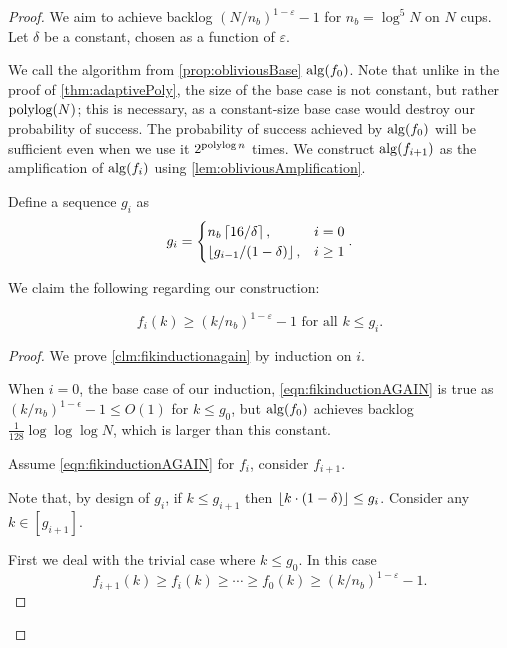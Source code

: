 \begin{proof}
  We aim to achieve backlog $(N/n_b)^{1-\varepsilon}-1$ for 
  $n_b = \log^5 N$ on $N$ cups.
  Let $\delta$ be a constant, chosen as a function of $\varepsilon$.

  We call the algorithm from \cref{prop:obliviousBase}
  $\operatorname{\text{\textup{alg}}}(f_0)$. Note that unlike in the proof of
  \cref{thm:adaptivePoly}, the size of the base case is not
  constant, but rather $\operatorname{\text{polylog}}(N)$; this is necessary, as a
  constant-size base case would destroy our probability of
  success. The probability of success achieved by $\operatorname{\text{\textup{alg}}}(f_0)$
  will be sufficient even when we use it $2^{\operatorname{\text{polylog}} n}$ times.
  We construct $\operatorname{\text{\textup{alg}}}(f_{i+1})$ as the amplification of $\operatorname{\text{\textup{alg}}}(f_i)$
  using \cref{lem:obliviousAmplification}.

  Define a sequence $g_i$ as 
  $$g_i =
  \begin{cases}
    n_b\left\lceil 16/\delta \right\rceil, & i=0\\
    \left\lfloor  g_{i-1}/(1-\delta)  \right\rfloor, & i\ge 1 
  \end{cases}.$$

  We claim the following regarding our construction:
  \begin{clm}
    \label{clm:fikinductionagain}
    \begin{equation}
      f_i(k) \ge (k/n_b)^{1-\varepsilon} - 1 \text{ for all } k \le g_i. \label{eqn:fikinductionAGAIN}
    \end{equation}
  \end{clm}
  \begin{proof}
  We prove \cref{clm:fikinductionagain} by induction on $i$. 

  When $i=0$, the base case of our induction,
  \eqref{eqn:fikinductionAGAIN} is true as
  $(k/n_b)^{1-\epsilon} - 1 \le O(1)$ for $k\le g_0$, but
  $\operatorname{\text{\textup{alg}}}(f_0)$ achieves backlog $\frac{1}{128}\log\log\log N$,
  which is larger than this constant.

  Assume \eqref{eqn:fikinductionAGAIN} for $f_i$, consider $f_{i+1}$. 

  Note that, by design of $g_i$, if $k \le g_{i+1}$ then $\left\lfloor k\cdot (1-\delta) \right\rfloor \le g_i$.
  Consider any $k\in [g_{i+1}]$. 

  First we deal with the trivial
  case where $k \le g_0$. In this case
  $$f_{i+1}(k) \ge f_i(k) \ge \cdots \ge f_0(k) \ge (k/n_b)^{1-\varepsilon} -1.$$


\end{proof}
\end{proof}
